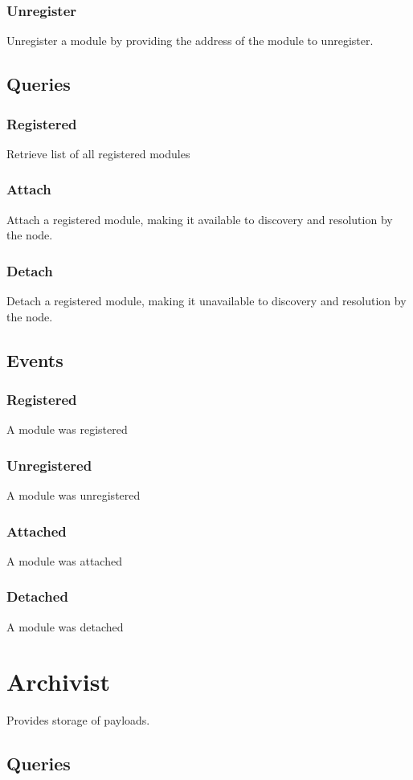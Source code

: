 \documentclass{article}
\begin{document}
\subsubsection{Unregister}
Unregister a module by providing the address of the module to unregister.

\subsection{Queries}
\subsubsection{Registered}
Retrieve list of all registered modules
\subsubsection{Attach}
Attach a registered module, making it available to discovery and resolution by the node.
\subsubsection{Detach}
Detach a registered module, making it unavailable to discovery and resolution by the node.

\subsection{Events}
\subsubsection{Registered}
A module was registered
\subsubsection{Unregistered}
A module was unregistered
\subsubsection{Attached}
A module was attached
\subsubsection{Detached}
A module was detached

\section{Archivist}
Provides storage of payloads.
\subsection{Queries}
\end{document}

